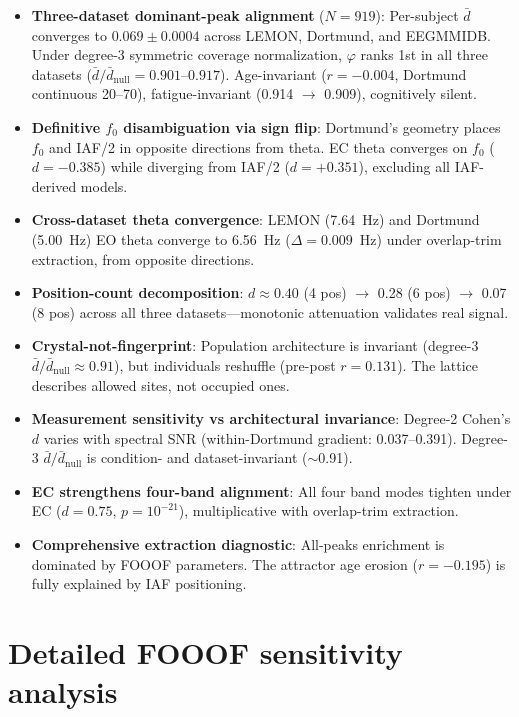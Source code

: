 \documentclass[11pt,a4paper]{article}
\newcommand{\phisym}{\varphi}
\newcommand{\fzero}{f_0}
\begin{document}
\begin{itemize}
    \item \textbf{Three-dataset dominant-peak alignment} ($N = 919$): Per-subject $\bar{d}$ converges to $0.069 \pm 0.0004$ across LEMON, Dortmund, and EEGMMIDB. Under degree-3 symmetric coverage normalization, $\phisym$ ranks 1st in all three datasets ($\bar{d}/\bar{d}_{\text{null}} = 0.901$--$0.917$). Age-invariant ($r = -0.004$, Dortmund continuous 20--70), fatigue-invariant (0.914 $\to$ 0.909), cognitively silent.
    \item \textbf{Definitive $\fzero$ disambiguation via sign flip}: Dortmund's geometry places $\fzero$ and IAF/2 in opposite directions from theta. EC theta converges on $\fzero$ ($d = -0.385$) while diverging from IAF/2 ($d = +0.351$), excluding all IAF-derived models.
    \item \textbf{Cross-dataset theta convergence}: LEMON (7.64~Hz) and Dortmund (5.00~Hz) EO theta converge to 6.56~Hz ($\Delta = 0.009$~Hz) under overlap-trim extraction, from opposite directions.
    \item \textbf{Position-count decomposition}: $d \approx 0.40$ (4 pos) $\to$ 0.28 (6 pos) $\to$ 0.07 (8 pos) across all three datasets---monotonic attenuation validates real signal.
    \item \textbf{Crystal-not-fingerprint}: Population architecture is invariant (degree-3 $\bar{d}/\bar{d}_{\text{null}} \approx 0.91$), but individuals reshuffle (pre-post $r = 0.131$). The lattice describes allowed sites, not occupied ones.
    \item \textbf{Measurement sensitivity vs architectural invariance}: Degree-2 Cohen's $d$ varies with spectral SNR (within-Dortmund gradient: 0.037--0.391). Degree-3 $\bar{d}/\bar{d}_{\text{null}}$ is condition- and dataset-invariant ($\sim$0.91).
    \item \textbf{EC strengthens four-band alignment}: All four band modes tighten under EC ($d = 0.75$, $p = 10^{-21}$), multiplicative with overlap-trim extraction.
    \item \textbf{Comprehensive extraction diagnostic}: All-peaks enrichment is dominated by FOOOF parameters. The attractor age erosion ($r = -0.195$) is fully explained by IAF positioning.
\end{itemize}

\section{Detailed FOOOF sensitivity analysis}
\end{document}
